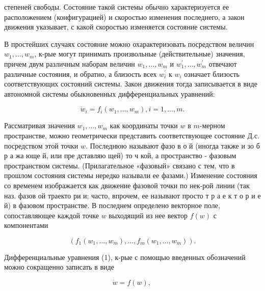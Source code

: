 \documentclass[10pt]{article}
\begin{document}
степеней свободы. Состояние такой системы обычно характеризуется ее расположением (конфигурацией) и скоростью изменения последнего, а закон движения указывает, с какой скоростью изменяется состояние системы.



В простейших случаях состояние можно охарактеризовать посредством величин $w_{1}, \ldots, w_{m}$, к-рые могут принимать произвольные (действительные) значения, причем двум различным наборам величин $w_{1}, \ldots, w_{m}$ и $w_{1}^{\prime}, \ldots, w_{m}^{\prime}$ отвечают различные состояния, и обратно, а близость всех $w_{i}^{\prime}$ к $w_{i}$ означает близость соответствующих состояний системы. Закон движения тогда записывается в виде автономной системы обыкновенных дифференциальных уравнений:



\[

\dot{w}_{i}=f_{i}\left(w_{1}, \ldots, w_{m}\right), i=1, \ldots, m .

\]



Рассматривая значения $w_{1}, \ldots, w_{m}$ как координаты точки $w$ в $m$-мерном пространстве, можно геометрически представить соответствующее состояние Д.с. посредством этой точки $w$. Последнюю называют фазо в о й (иногда также и зо б р а жа юще й, или пре дставляю щей) то ч кой, а пространство - фазовым пространством системы. (Прилагательное «фазовый» связано с тем, что в прошлом состояния системы нередко называли ее фазами.) Изменение состояния со временем изображается как движение фазовой точки по нек-рой линии (так наз. фазов ой траекто ри и; часто, впрочем, ее называют просто т р а е к т о р и е й) в фазовом пространстве. В последнем определено векторное поле, сопоставляющее каждой точке $w$ выходящий из нее вектор $f(w)$ с компонентами



\[

\left(f_{1}\left(w_{1}, \ldots, w_{m}\right), \ldots, f_{m}\left(w_{1}, \ldots, w_{m}\right)\right) .

\]



Дифференциальные уравнения (1), к-рые с помощью введенных обозначений можно сокращенно записать в виде



\[

\dot{w}=f(w) \text {, }

\]
\end{document}
